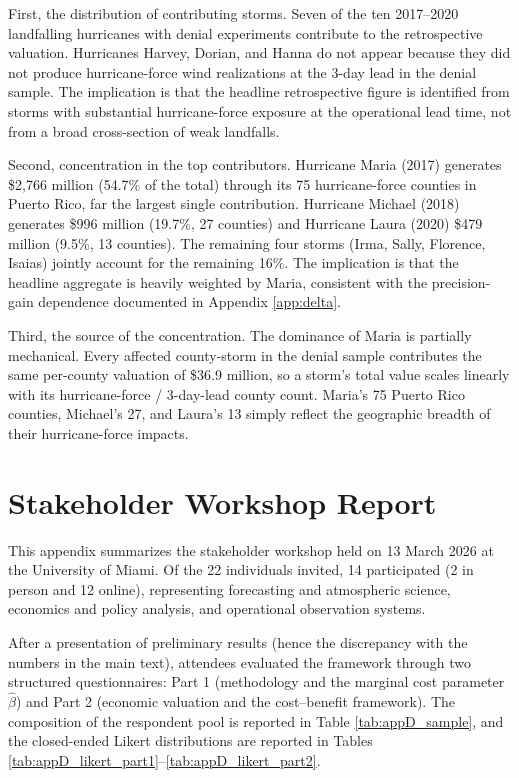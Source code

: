 \documentclass[12pt]{article}%
\begin{document}
\begin{appendices}
First, the distribution of contributing storms. Seven of the ten 2017--2020 landfalling hurricanes with denial experiments contribute to the retrospective valuation. Hurricanes Harvey, Dorian, and Hanna do not appear because they did not produce hurricane-force wind realizations at the 3-day lead in the denial sample. The implication is that the headline retrospective figure is identified from storms with substantial hurricane-force exposure at the operational lead time, not from a broad cross-section of weak landfalls.

Second, concentration in the top contributors. Hurricane Maria (2017) generates \$2,766 million (54.7\% of the total) through its 75 hurricane-force counties in Puerto Rico, far the largest single contribution. Hurricane Michael (2018) generates \$996 million (19.7\%, 27 counties) and Hurricane Laura (2020) \$479 million (9.5\%, 13 counties). The remaining four storms (Irma, Sally, Florence, Isaias) jointly account for the remaining 16\%. The implication is that the headline aggregate is heavily weighted by Maria, consistent with the precision-gain dependence documented in Appendix \ref{app:delta}.

Third, the source of the concentration. The dominance of Maria is partially mechanical. Every affected county-storm in the denial sample contributes the same per-county valuation of \$36.9 million, so a storm's total value scales linearly with its hurricane-force / 3-day-lead county count. Maria's 75 Puerto Rico counties, Michael's 27, and Laura's 13 simply reflect the geographic breadth of their hurricane-force impacts.



\section{Stakeholder Workshop Report} \label{app:workshop}

This appendix summarizes the stakeholder workshop held on 13 March 2026 at the University of Miami. Of the 22 individuals invited, 14 participated (2 in person and 12 online), representing forecasting and atmospheric science, economics and policy analysis, and operational observation systems. 

After a presentation of preliminary results (hence the discrepancy with the numbers in the main text), attendees evaluated the framework through two structured questionnaires: Part 1 (methodology and the marginal cost parameter $\hat{\beta}$) and Part 2 (economic valuation and the cost--benefit framework). The composition of the respondent pool is reported in Table \ref{tab:appD_sample}, and the closed-ended Likert distributions are reported in Tables \ref{tab:appD_likert_part1}--\ref{tab:appD_likert_part2}.


\end{appendices}
\end{document}
